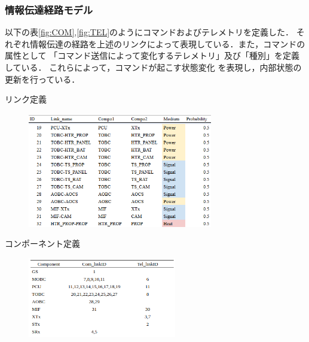 \documentclass[11pt]{jsarticle}%
\begin{document}
\begin{multicols}{2}
\subsubsection{情報伝達経路モデル}
以下の表\ref{fig:COM},\ref{fig:TEL}のようにコマンドおよびテレメトリを定義した．
それぞれ情報伝達の経路を上述のリンクによって表現している．また，コマンドの属性として
「コマンド送信によって変化するテレメトリ」及び「種別」を定義している．
これらによって，コマンドが起こす状態変化
を表現し，内部状態の更新を行っている．%
\newpage
\begin{table}[H]
  \centering
  \caption{リンク定義}
  \label{fig:link}
\end{table}
\vspace{-3zh}
\begin{figure}[H]
  \centering
    \includegraphics[height=5.0cm]{../figure/link_definition_resume.png}
\end{figure}
\vspace{-2zh}
\begin{table}[H]
  \centering
  \caption{コンポーネント定義}
  \label{fig:compo}
\end{table}
\vspace{-3zh}
\begin{figure}[H]
  \centering
    \includegraphics[height=3.5cm]{../figure/compo_link_resume.png}
\end{figure}
\vspace{-2zh}

\end{multicols}
\end{document}
